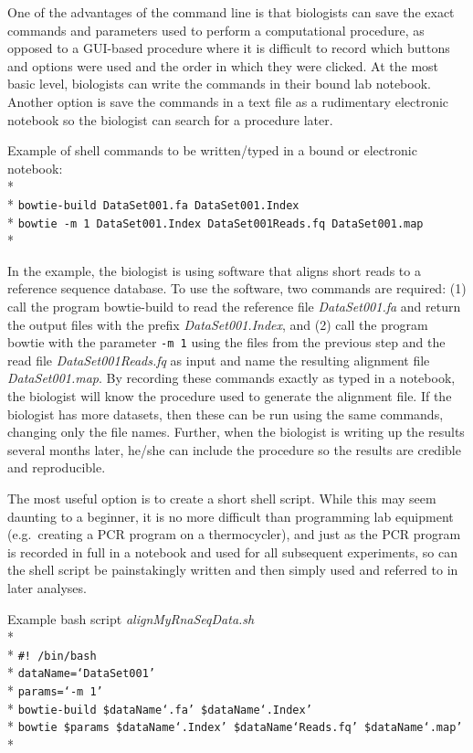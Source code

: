 \documentclass[ChapterTOCs,krantz2]{krantz} %
\begin{document}
One of the advantages of the command line is
that biologists can save the exact commands and parameters used to perform a
computational procedure, as opposed to a GUI-based procedure where it is
difficult to record which buttons and options were used and the order in which
they were clicked.  At the most basic level, biologists can write the commands
in their bound lab notebook.  Another option is save the commands in a text
file as a rudimentary electronic notebook so the biologist can search for a
procedure later.   

Example of shell commands to be written/typed in a bound or electronic notebook:\\* \\*
\texttt{bowtie-build DataSet001.fa DataSet001.Index}\\*
\texttt{bowtie -m 1 DataSet001.Index DataSet001Reads.fq DataSet001.map }\\*

In the example, the biologist is using software that aligns short reads
to a reference sequence database.  To use the software, two commands are required:
(1) call the program bowtie-build to read the reference file
\emph{DataSet001.fa} and
return the output files with the prefix \emph{DataSet001.Index},
and (2) call the program bowtie with the parameter \texttt{-m 1} using the files from the
previous step and the read file \emph{DataSet001Reads.fq} as input and name the
resulting alignment file \emph{DataSet001.map}.  By recording these commands exactly
as typed in a notebook, the biologist will know the procedure used to generate
the alignment file.  If the biologist has more datasets, then these can be run
using the same commands, changing only the file names.  Further, when the
biologist is writing up the results several months later, he/she can include
the procedure so the results are credible and reproducible.

The most useful option is to create a short shell script.  While this may seem
daunting to a beginner, it is no more difficult than programming lab
equipment (e.g.\ creating a PCR program on a thermocycler), and just as the PCR
program is recorded in full in a notebook and used for all subsequent
experiments, so can the shell script be painstakingly written and then simply
used and referred to in later analyses.  


Example bash script \emph{alignMyRnaSeqData.sh}\\* \\*
\texttt{\#! /bin/bash}\\*
\texttt{dataName=`DataSet001'}\\*
\texttt{params=`-m 1'}\\*
\texttt{bowtie-build \$dataName`.fa' \$dataName`.Index'}\\*
\texttt{bowtie \$params \$dataName`.Index' \$dataName`Reads.fq' \$dataName`.map' }\\*
\end{document}
